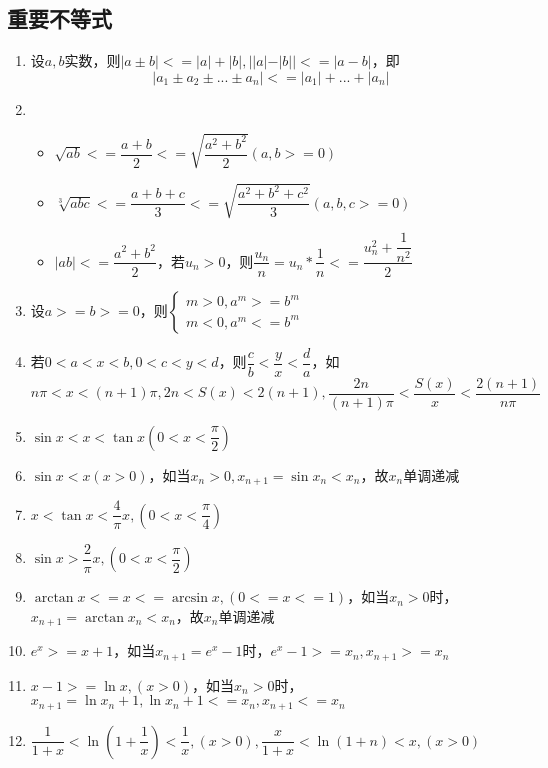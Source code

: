 \subsection{重要不等式}
\begin{enumerate}
    \item 设\(a, b\)实数，则\(|a \pm b| <= |a| + |b|, ||a| - |b|| <= |a - b|\)，即\[|a_1 \pm a_2 \pm ... \pm a_n| <= |a_1| + ... + |a_n|\]
    \item \begin{itemize}
        \item \(\sqrt{ab} <= \dfrac{a + b}{2} <= \sqrt{\dfrac{a^2 + b^2}{2}}(a, b >= 0)\)
        \item \(\sqrt[3]{abc} <= \dfrac{a + b + c}{3} <= \sqrt{\dfrac{a^2 + b^2 + c^2}{3}}(a, b, c >= 0)\)
        \item \(|ab| <= \dfrac{a^2 + b^2}{2}\)，若\(u_n > 0\)，则\(\dfrac{u_n}{n} = u_n * \dfrac{1}{n} <= \dfrac{u_n^2 + \dfrac{1}{n^2}}{2}\)
    \end{itemize}
    \item 设\(a >= b >= 0\)，则\(
    \begin{cases}
    m > 0, a^m >= b^m \\ 
    m < 0, a^m <= b^m
    \end{cases}\)
    \item 若\(0 < a < x < b, 0 < c < y < d\)，则\(\dfrac{c}{b} < \dfrac{y}{x} < \dfrac{d}{a}\)，如\(n\pi < x < (n + 1)\pi, 2n < S(x) < 2(n + 1), \dfrac{2n}{(n + 1)\pi} < \dfrac{S(x)}{x} < \dfrac{2(n + 1)}{n\pi}\)
    \item \(\sin x < x < \tan x(0 < x < \dfrac{\pi}{2})\)
    \item \(\sin x < x(x > 0)\)，如当\(x_n > 0, x_{n + 1} = \sin x_n < x_n\)，故{\(x_n\)}单调递减
    \item \(x < \tan x < \dfrac{4}{\pi}x, (0 < x < \dfrac{\pi}{4})\)
    \item \(\sin x > \dfrac{2}{\pi}x, (0 < x < \dfrac{\pi}{2})\)
    \item \(\arctan x <= x <= \arcsin x, (0 <= x <= 1)\)，如当\(x_n > 0\)时，\(x_{n + 1} = \arctan x_n < x_n\)，故{\(x_n\)}单调递减
    \item \(e^x >= x + 1\)，如当\(x_{n + 1} = e^x - 1\)时，\(e^x - 1 >= x_n, x_{n + 1} >= x_n\)
    \item \(x - 1 >= \ln x, (x > 0)\)，如当\(x_n > 0\)时，\(x_{n + 1} = \ln x_n + 1, \ln x_n + 1 <= x_n, x_{n + 1} <= x_n\)
    \item \(\dfrac{1}{1 + x} < \ln(1 + \dfrac{1}{x}) < \dfrac{1}{x}, (x > 0), \dfrac{x}{1 + x} < \ln(1 + n) < x, (x > 0)\)
\end{enumerate}






